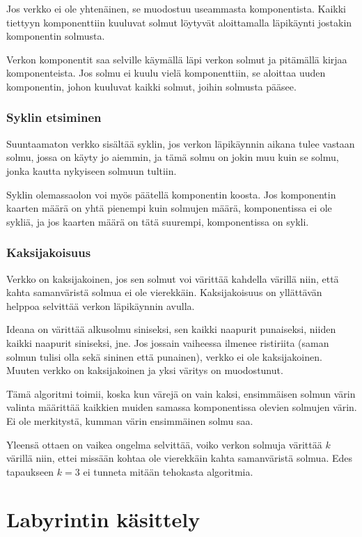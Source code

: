 Jos verkko ei ole yhtenäinen,
se muodostuu useammasta komponentista.
Kaikki tiettyyn komponenttiin kuuluvat
solmut löytyvät aloittamalla
läpikäynti jostakin komponentin solmusta.

Verkon komponentit saa selville
käymällä läpi verkon solmut ja
pitämällä kirjaa komponenteista.
Jos solmu ei kuulu vielä
komponenttiin, se aloittaa uuden
komponentin, johon kuuluvat kaikki
solmut, joihin solmusta pääsee.

\subsubsection{Syklin etsiminen}

Suuntaamaton verkko sisältää syklin,
jos verkon läpikäynnin aikana tulee vastaan
solmu, jossa on käyty jo aiemmin,
ja tämä solmu on jokin muu kuin se solmu,
jonka kautta nykyiseen solmuun tultiin.

Syklin olemassaolon voi myös päätellä
komponentin koosta. Jos komponentin
kaarten määrä on yhtä pienempi kuin
solmujen määrä, komponentissa ei ole sykliä,
ja jos kaarten määrä on tätä suurempi,
komponentissa on sykli.

\subsubsection{Kaksijakoisuus}

Verkko on kaksijakoinen,
jos sen solmut voi värittää
kahdella värillä
niin, että kahta samanväristä
solmua ei ole vierekkäin.
Kaksijakoisuus on yllättävän
helppoa selvittää
verkon läpikäynnin avulla.

Ideana on värittää alkusolmu
siniseksi, sen kaikki naapurit
punaiseksi, niiden kaikki naapurit
siniseksi, jne.
Jos jossain vaiheessa
ilmenee ristiriita
(saman solmun tulisi olla sekä
sininen että punainen),
verkko ei ole kaksijakoinen.
Muuten verkko on kaksijakoinen
ja yksi väritys on muodostunut.

Tämä algoritmi toimii,
koska kun värejä on vain kaksi,
ensimmäisen solmun värin valinta
määrittää kaikkien muiden
samassa komponentissa olevien
solmujen värin.
Ei ole merkitystä,
kumman värin ensimmäinen
solmu saa.

Yleensä ottaen on vaikea ongelma
selvittää, voiko verkon solmuja
värittää $k$ värillä niin,
ettei missään kohtaa ole vierekkäin
kahta samanväristä solmua.
Edes tapaukseen $k=3$ ei tunneta
mitään tehokasta algoritmia.

\section{Labyrintin käsittely}

